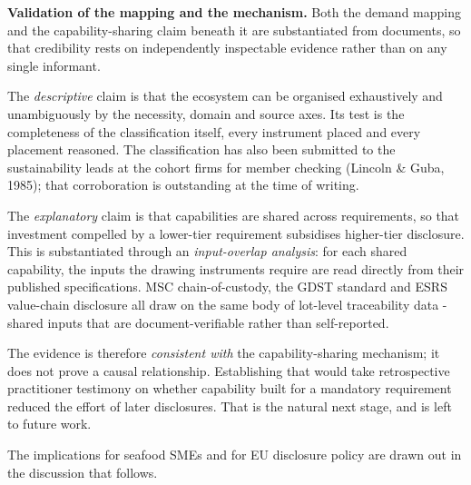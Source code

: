 \textbf{Validation of the mapping and the mechanism.} Both the demand mapping and
the capability-sharing claim beneath it are substantiated from documents, so that
credibility rests on independently inspectable evidence rather than on any single
informant.

The \emph{descriptive} claim is that the ecosystem can be organised exhaustively
and unambiguously by the necessity, domain and source axes. Its test is the
completeness of the classification itself, every instrument placed and every
placement reasoned. The classification has also been submitted to the
sustainability leads at the cohort firms for member checking (Lincoln \& Guba,
1985); that corroboration is outstanding at the time of writing.

The \emph{explanatory} claim is that capabilities are shared across requirements,
so that investment compelled by a lower-tier requirement subsidises higher-tier
disclosure. This is substantiated through an \emph{input-overlap analysis}: for
each shared capability, the inputs the drawing instruments require are read
directly from their published specifications. MSC chain-of-custody, the GDST
standard and ESRS value-chain disclosure all draw on the same body of lot-level
traceability data - shared inputs that are document-verifiable rather than
self-reported.

The evidence is therefore \emph{consistent with} the capability-sharing mechanism;
it does not prove a causal relationship. Establishing that would take retrospective
practitioner testimony on whether capability built for a mandatory requirement
reduced the effort of later disclosures. That is the natural next stage, and is
left to future work.

\medskip
The implications for seafood SMEs and for EU disclosure policy are drawn out
in the discussion that follows.

